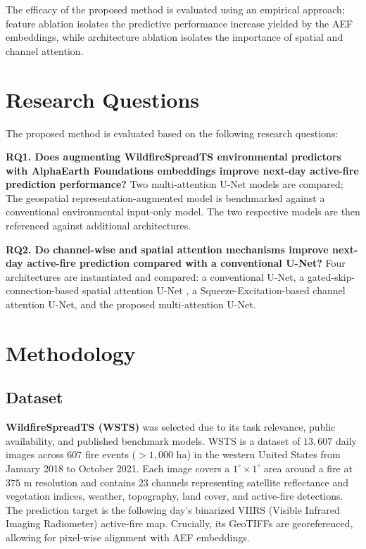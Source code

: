 \documentclass[sigconf]{acmart}
\begin{document}
The efficacy of the proposed method is evaluated using an empirical approach; feature ablation isolates 
the predictive performance increase yielded by the AEF embeddings, while architecture ablation isolates the 
importance of spatial and channel attention.

\section{Research Questions}
The proposed method is evaluated based on the following research questions:

\textbf{RQ1. Does augmenting WildfireSpreadTS environmental predictors with AlphaEarth 
Foundations embeddings improve next-day active-fire prediction performance?} Two multi-attention U-Net models are 
compared; The geospatial representation-augmented model is benchmarked against a conventional environmental 
input-only model. The two respective models are then referenced against additional architectures.

\textbf{RQ2. Do channel-wise and spatial attention mechanisms improve next-day 
active-fire prediction compared with a conventional U-Net?} Four architectures are instantiated and compared: a 
conventional U-Net, a gated-skip-connection-based spatial attention U-Net \cite{almakrami}, a 
Squeeze-Excitation-based channel attention \cite{SE2017} U-Net, and the proposed multi-attention U-Net.

\section{Methodology}
\subsection{Dataset}
\textbf{WildfireSpreadTS (WSTS)} \cite{gerard2023wildfirespreadts} was selected due to its 
task relevance, public availability, and published benchmark models. WSTS is a dataset of
$13,607$ daily images across 607 fire events ($>1,000$ ha) in the western United
States from January 2018 to October 2021. Each image covers a $1^\circ\times
1^\circ$ area around a fire at $375$ m resolution and contains $23$ channels
representing satellite reflectance and vegetation indices, weather, topography,
land cover, and active-fire detections. The prediction target is the following
day's binarized VIIRS (Visible Infrared Imaging Radiometer) active-fire map. Crucially, its GeoTIFFs
are georeferenced, allowing for pixel-wise alignment with AEF embeddings.
\end{document}
